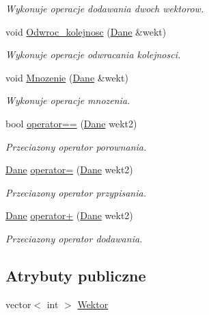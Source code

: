 \begin{DoxyCompactItemize}
\begin{DoxyCompactList}\small\item\em \-Wykonuje operacje dodawania dwoch wektorow. \end{DoxyCompactList}\item 
void \hyperlink{class_dane_ab08ced663f4ec81e4dfb75c69fd6086d}{\-Odwroc\-\_\-kolejnosc} (\hyperlink{class_dane}{\-Dane} \&wekt)
\begin{DoxyCompactList}\small\item\em \-Wykonuje operacje odwracania kolejnosci. \end{DoxyCompactList}\item 
void \hyperlink{class_dane_ad651a90415d5253f5e2a0354a741dc7d}{\-Mnozenie} (\hyperlink{class_dane}{\-Dane} \&wekt)
\begin{DoxyCompactList}\small\item\em \-Wykonuje operacje mnozenia. \end{DoxyCompactList}\item 
bool \hyperlink{class_dane_ad1c18435a6a4cfbf3f4e9bf8206f2c5b}{operator==} (\hyperlink{class_dane}{\-Dane} wekt2)
\begin{DoxyCompactList}\small\item\em \-Przeciazony operator porownania. \end{DoxyCompactList}\item 
\hyperlink{class_dane}{\-Dane} \hyperlink{class_dane_af96bf2caf07a4efa399c33dbcdf8cd8b}{operator=} (\hyperlink{class_dane}{\-Dane} wekt2)
\begin{DoxyCompactList}\small\item\em \-Przeciazony operator przypisania. \end{DoxyCompactList}\item 
\hyperlink{class_dane}{\-Dane} \hyperlink{class_dane_a467fa5351b4475311e5a43f95e9695b3}{operator+} (\hyperlink{class_dane}{\-Dane} wekt2)
\begin{DoxyCompactList}\small\item\em \-Przeciazony operator dodawania. \end{DoxyCompactList}\end{DoxyCompactItemize}
\subsection*{\-Atrybuty publiczne}
\begin{DoxyCompactItemize}
\item 
vector$<$ int $>$ \hyperlink{class_dane_aa8148a6368fb47fb1f08e88514561cf4}{\-Wektor}
\end{DoxyCompactItemize}
